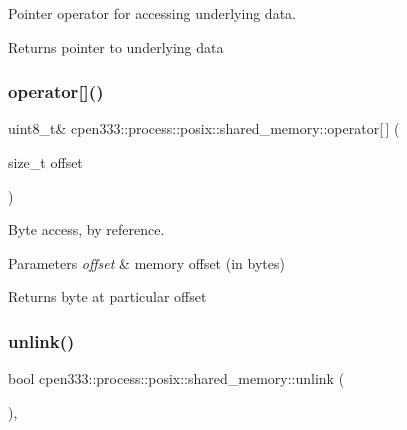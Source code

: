 Pointer operator for accessing underlying data. 

\begin{DoxyReturn}{Returns}
pointer to underlying data 
\end{DoxyReturn}
\mbox{\label{classcpen333_1_1process_1_1posix_1_1shared__memory_a832b82cb6ab398e814418b516dba2dd9}} 
\subsubsection{\texorpdfstring{operator[]()}{operator[]()}}
{\footnotesize\ttfamily uint8\+\_\+t\& cpen333\+::process\+::posix\+::shared\+\_\+memory\+::operator\mbox{[}$\,$\mbox{]} (\begin{DoxyParamCaption}\item[{size\+\_\+t}]{offset }\end{DoxyParamCaption})\hspace{0.3cm}{\ttfamily [inline]}}



Byte access, by reference. 


\begin{DoxyParams}{Parameters}
{\em offset} & memory offset (in bytes) \\
\hline
\end{DoxyParams}
\begin{DoxyReturn}{Returns}
byte at particular offset 
\end{DoxyReturn}
\mbox{\label{classcpen333_1_1process_1_1posix_1_1shared__memory_a3b6d67a41cfaca3712d87958682d8bbe}} 
\subsubsection{\texorpdfstring{unlink()}{unlink()}\hspace{0.1cm}{\footnotesize\ttfamily [1/2]}}
{\footnotesize\ttfamily bool cpen333\+::process\+::posix\+::shared\+\_\+memory\+::unlink (\begin{DoxyParamCaption}{ }\end{DoxyParamCaption})\hspace{0.3cm}{\ttfamily [inline]}, {\ttfamily [virtual]}}



